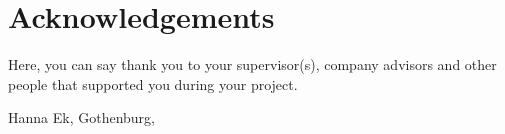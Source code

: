 \thispagestyle{plain}			%
\section*{Acknowledgements}
Here, you can say thank you to your supervisor(s), company advisors and other people that supported you during your project.

\vspace{1.5cm}
\hfill
Hanna Ek, Gothenburg, \monthname \space \the\year

\newpage				%
\thispagestyle{empty}
\mbox{}